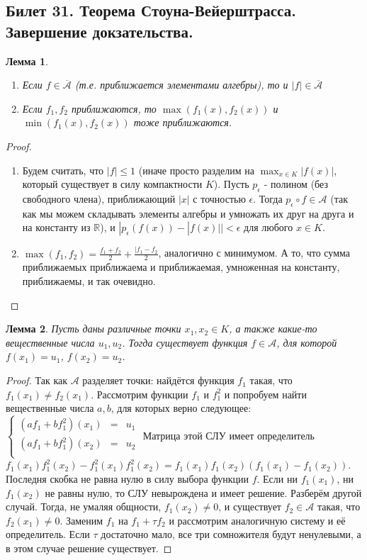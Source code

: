 \documentclass[a4paper]{article}
\theoremstyle{indented}
\newtheorem{lemma}{Лемма}
\theoremstyle{definition}
\theoremstyle{remark}
\begin{document}
\subsection{Билет 31. Теорема Стоуна-Вейерштрасса. Завершение докзательства.}

\begin{lemma}
\begin{enumerate}
    \item Если $f \in \overline{\mathcal{A}}$ (т.е. приближается элементами алгебры), то и $|f| \in \overline{\mathcal{A}}$
    \item Если $f_1, f_2$ приближаются, то $\max(f_1(x), f_2(x))$ и $\min(f_1(x), f_2(x))$ тоже приближаются.
\end{enumerate}
\end{lemma}
\begin{proof}
    \begin{enumerate}
        \item Будем считать, что $|f| \leq 1$ (иначе просто разделим на $\max_{x \in K} |f(x)|$, который существует в силу компактности $K$). Пусть $p_{\epsilon}$ - полином (без свободного члена), приближающий $|x|$ с точностью $\epsilon$. Тогда $p_{\epsilon} \circ f \in \mathcal{A}$ (так как мы можем складывать элементы алгебры и умножать их друг на друга и на константу из $\mathbb{R}$), и $|p_{\epsilon}(f(x))-|f(x)||< \epsilon$ для любого $x \in K$.
        \item $\max(f_1, f_2)=\frac{f_1+f_2}{2}+\frac{|f_1-f_2}{2}$, аналогично с минимумом. А то, что сумма приближаемых приближаема и приближаемая, умноженная на константу, приближаемы, и так очевидно.
    \end{enumerate}
\end{proof}
\begin{lemma}
Пусть даны различные точки $x_1, x_2 \in K$, а также какие-то вещественные числа $u_1, u_2$. Тогда существует функция $f \in \mathcal{A}$, для которой $f(x_1)=u_1$, $f(x_2)=u_2$.
\end{lemma}
\begin{proof}
    Так как $\mathcal{A}$ разделяет точки: найдётся функция $f_1$ такая, что $f_1(x_1) \neq f_2(x_1)$. Рассмотрим функции $f_1$ и $f_1^2$ и попробуем найти вещественные числа $a, b$, для которых верно следующее:
    $\left\{
  \begin{array}{ccc}
    (af_1+bf_1^2)(x_1) & = & u_1 \\
    (af_1+bf_1^2)(x_2) & = & u_2 \\
  \end{array}
\right.$
Матрица этой СЛУ имеет определитель $f_1(x_1)f_1^2(x_2)-f_1^2(x_1)f_1^2(x_2)=f_1(x_1)f_1(x_2)(f_1(x_1)-f_1(x_2))$. Последня скобка не равна нулю в силу выбора функции $f$. Если ни $f_1(x_1)$, ни $f_1(x_2)$ не равны нулю, то СЛУ невырождена и имеет решение. Разберём другой случай. Тогда, не умаляя общности, $f_1(x_2) \neq 0$, и существует $f_2 \in \mathcal{A}$ такая, что $f_2(x_1) \neq 0$. Заменим $f_1$ на $f_1+\tau f_2$ и рассмотрим аналогичную систему и её определитель. Если $\tau$ достаточно мало, все три сомножителя будут ненулевыми, а в этом случае решение существует.
\end{proof}
\end{document}
